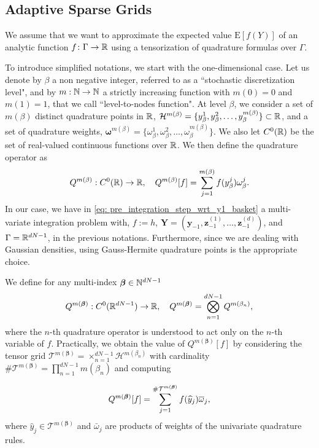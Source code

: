 \subsection{Adaptive Sparse Grids}\label{sec:Details of the MISC}

We assume that we want to approximate the expected value $\text{E}[f(Y)]$ of an analytic function $f\colon \Gamma \to \mathbb{R}$ using a tensorization of quadrature formulas over $\Gamma$.

To introduce simplified notations, we start with the one-dimensional case. Let us denote by $\beta$ a non negative integer, referred to as a ``stochastic discretization level", and by $m: \mathbb{N} \rightarrow \mathbb{N}$  a strictly increasing function with $m(0)=0$ and $m(1)=1$, that we call  ``level-to-nodes function". At level $\beta$, we consider a set of $m(\beta)$ distinct quadrature points in $\mathbb{R}$, $\mathcal{H}^{m(\beta)}=\{y^1_\beta,y^2_\beta,\dots,y_\beta^{m(\beta)}\} \subset \mathbb{R}$, and a set of quadrature weights, $\boldsymbol{\omega}^{m(\beta)}=\{\omega^1_\beta,\omega^2_\beta,\dots,\omega_\beta^{m(\beta)}\}$. We also let $C^0(\mathbb{R})$ be the set of real-valued continuous functions over $\mathbb{R}$. We then define the quadrature operator as
\begin{equation*}
Q^{m(\beta)}:C^0(\mathbb{R}) \rightarrow \mathbb{R}, \quad Q^{m(\beta)}[f]= \sum_{j=1}^{m(\beta)} f(y^j_\beta) \omega_\beta^j.
\end{equation*}
In our case, we have in \eqref{eq: pre_integration_step_wrt_y1_basket} a multi-variate integration problem with, $f:=h$, $\mathbf{Y}=(\mathbf{y}_{-1},\mathbf{z}^{(1)}_{-1},\dots,\mathbf{z}^{(d)}_{-1})$,  and  $\Gamma=\mathbb{R}^{dN-1}$, in the previous notations.  Furthermore, since we are dealing with Gaussian densities, using Gauss-Hermite quadrature points is the appropriate choice.

We define for any multi-index $\boldsymbol{\beta} \in \mathbb{N}^{dN-1}$
$$Q^{m(\boldsymbol{\beta})}: C^0(\mathbb{R}^{dN-1}) \rightarrow \mathbb{R},\quad  Q^{m(\boldsymbol{\beta})}= \bigotimes_{n = 1}^{dN-1} Q^{m(\beta_n)} , $$
where the $n$-th quadrature operator is understood to act only on the $n$-th variable of $f$. Practically, we obtain the value of $Q^{m(\boldsymbol{\beta})}[f]$  by considering the tensor grid $\mathcal{T}^{m(\boldsymbol{\beta})}= \times_{n = 1}^{dN-1}  \mathcal{H}^{m(\beta_n)}$ with cardinality $\#\mathcal{T}^{m(\boldsymbol{\beta})}=\prod_{n=1}^{dN-1} m (\beta_n)$ and computing

$$ Q^{m(\boldsymbol{\beta})}[f]= \sum_{j=1}^{\#\mathcal{T}^{m(\boldsymbol{\beta})}} f(\widehat{y}_j) \overline{\omega}_j ,$$
where $\hat{y}_j \in \mathcal{T}^{m(\boldsymbol{\beta})}$ and $\bar{\omega}_j$ are  products of weights of the univariate quadrature rules.

